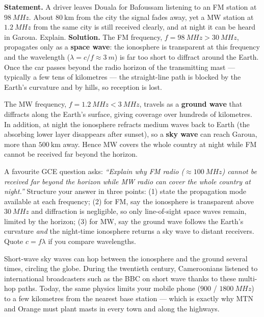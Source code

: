 \documentclass[11pt]{article}
\begin{document}
\begin{exoresolu}
\textbf{Statement.} A driver leaves Douala for Bafoussam listening to an FM station at $\SI{98}{MHz}$. About $80\ \mathrm{km}$ from the city the signal fades away, yet a MW station at $\SI{1.2}{MHz}$ from the same city is still received clearly, and at night it can be heard in Garoua. Explain.
\tcblower
\textbf{Solution.}
The FM frequency, $f = \SI{98}{MHz} > \SI{30}{MHz}$, propagates only as a \textbf{space wave}: the ionosphere is transparent at this frequency and the wavelength ($\lambda = c/f \approx \SI{3}{m}$) is far too short to diffract around the Earth. Once the car passes beyond the radio horizon of the transmitting mast --- typically a few tens of kilometres --- the straight-line path is blocked by the Earth's curvature and by hills, so reception is lost.

The MW frequency, $f = \SI{1.2}{MHz} < \SI{3}{MHz}$, travels as a \textbf{ground wave} that diffracts along the Earth's surface, giving coverage over hundreds of kilometres. In addition, at night the ionosphere refracts medium waves back to Earth (the absorbing lower layer disappears after sunset), so a \textbf{sky wave} can reach Garoua, more than $500\ \mathrm{km}$ away. Hence MW covers the whole country at night while FM cannot be received far beyond the horizon.
\end{exoresolu}

\begin{attention}
A favourite GCE question asks: \emph{``Explain why FM radio ($\approx \SI{100}{MHz}$) cannot be received far beyond the horizon while MW radio can cover the whole country at night.''} Structure your answer in three points: (1) state the propagation mode available at each frequency; (2) for FM, say the ionosphere is transparent above $\SI{30}{MHz}$ and diffraction is negligible, so only line-of-sight space waves remain, limited by the horizon; (3) for MW, say the ground wave follows the Earth's curvature \emph{and} the night-time ionosphere returns a sky wave to distant receivers. Quote $c = f\lambda$ if you compare wavelengths.
\end{attention}

\begin{savaistu}
Short-wave sky waves can hop between the ionosphere and the ground several times, circling the globe. During the twentieth century, Cameroonians listened to international broadcasters such as the BBC on short wave thanks to these multi-hop paths. Today, the same physics limits your mobile phone ($900$ / $\SI{1800}{MHz}$) to a few kilometres from the nearest base station --- which is exactly why MTN and Orange must plant masts in every town and along the highways.
\end{savaistu}
\end{document}
